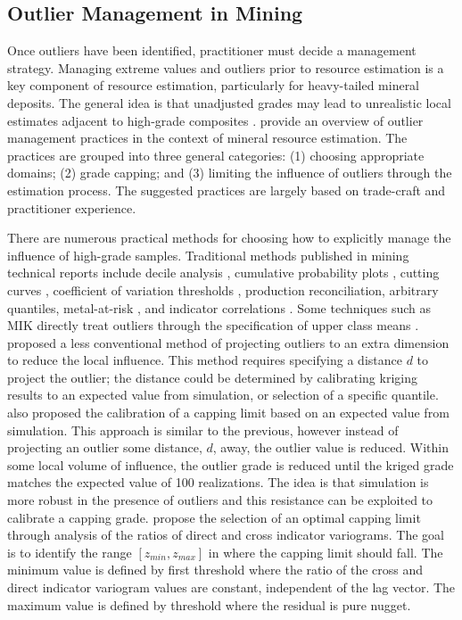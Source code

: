 \FloatBarrier
\subsection{Outlier Management in Mining}
\label{subsec:01outliermanage}

Once outliers have been identified, practitioner must decide a management strategy. Managing extreme values and outliers prior to resource estimation is a key component of resource estimation, particularly for heavy-tailed mineral deposits. The general idea is that unadjusted grades may lead to unrealistic local estimates adjacent to high-grade composites \citep{nowak2013suggestions}. \cite{leuangthong2015dealing} provide an overview of outlier management practices in the context of mineral resource estimation. The practices are grouped into three general categories: (1) choosing appropriate domains; (2) grade capping; and (3) limiting the influence of outliers through the estimation process. The suggested practices are largely based on trade-craft and practitioner experience.

There are numerous practical methods for choosing how to explicitly manage the influence of high-grade samples. Traditional methods published in mining technical reports include decile analysis \citep{parrish1997geologist}, cumulative probability plots \citep{rossi2013mineral}, cutting curves \citep{roscoe1996cutting}, coefficient of variation thresholds \citep{parker1991statistical}, production reconciliation, arbitrary quantiles, metal-at-risk \citep{parker2006}, and indicator correlations \citep{nowak2019optimal}.  Some techniques such as \gls{MIK} \citep{journel1983nonparametric} directly treat outliers through the specification of upper class means \citep{rossi2013mineral}. \cite{babakhani2014geostatistical} proposed a less conventional method of projecting outliers to an extra dimension to reduce the local influence. This method requires specifying a distance $d$ to project the outlier; the distance could be determined by calibrating kriging results to an expected value from simulation, or selection of a specific quantile. \cite{babakhani2014geostatistical} also proposed the calibration of a capping limit based on an expected value from simulation. This approach is similar to the previous, however instead of projecting an outlier some distance, $d$, away, the outlier value is reduced. Within some local volume of influence, the outlier grade is reduced until the kriged grade matches the expected value of 100 realizations. The idea is that simulation is more robust in the presence of outliers and this resistance can be exploited to calibrate a capping grade. \cite{rivoirard2013topcut,maleki2014capping} propose the selection of an optimal capping limit through analysis of the ratios of direct and cross indicator variograms. The goal is to identify the range $[z_{min}, z_{max}]$ in where the capping limit should fall. The minimum value is defined by first threshold where the ratio of the cross and direct indicator variogram values are constant, independent of the lag vector. The maximum value is defined by threshold where the residual is pure nugget.

